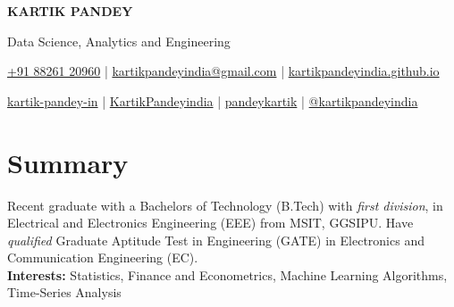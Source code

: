 \documentclass[a4paper,11pt]{article}
\newcommand{\socialicon}[1]{\raisebox{-0.05em}{\resizebox{!}{1em}{#1}}}
\newcommand{\ieeeicon}[1]{\raisebox{-0.3em}{\resizebox{!}{1.3em}{#1}}}
\newcommand{\headerfontx}{\fontfamily{bch}\selectfont} %
\begin{document}
\headerfontx

\begin{center}
    {\Huge\textbf{KARTIK PANDEY}}
\end{center}
\vspace{-6mm}

\begin{center}
    \small{Data Science, Analytics and Engineering}
\end{center}
\vspace{-6mm}

\begin{center}
    \small{
    \href{tel:+918826120960}{ +91 88261 20960} | \href{mailto:kartikpandeyindia@gmail.com}{ kartikpandeyindia@gmail.com} | 
    \href{https://kartikpandeyindia.github.io/}{kartikpandeyindia.github.io}
    }
\end{center}
\vspace{-6mm}

\begin{center}
    \scriptsize{
    \socialicon{\faLinkedin} \href{https://www.linkedin.com/in/kartik-pandey-india}{kartik-pandey-in} | 
    \socialicon{\faGithub} \href{https://github.com/KartikPandeyindia}{KartikPandeyindia} | 
    \socialicon{\faKaggle}  \href{https://www.kaggle.com/pandeykartik}{pandeykartik} |
    \socialicon{\faMedium} \href{https://medium.com/@kartikpandeyindia}{@kartikpandeyindia}
    }
\end{center}

\vspace{-4mm}

\section{\textbf{Summary}}
\vspace{1mm}
\small{
Recent graduate with a Bachelors of Technology (B.Tech) with \textit{first division}, in Electrical and Electronics Engineering (EEE) from MSIT, GGSIPU. Have \textit{qualified} Graduate Aptitude Test in Engineering (GATE) in Electronics and Communication Engineering (EC). \\
\textbf{Interests: } Statistics, Finance and Econometrics, Machine Learning Algorithms, Time-Series Analysis 
}
\vspace{-2mm}
\end{document}
